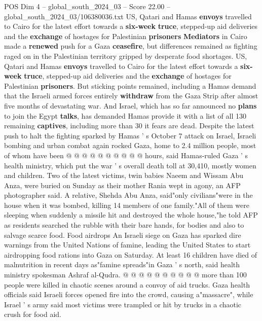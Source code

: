 \begin{textsample}{POS Dim 4 – global\_south\_2024\_03 – Score 22.00 – global\_south\_2024\_03/106380036.txt}  \label{ex:f4_pos_101}
US, Qatari and Hamas \textbf{envoys} travelled to Cairo for the latest effort towards a \textbf{six-week} \textbf{truce}, stepped-up aid deliveries and the \textbf{exchange} of hostages for Palestinian \textbf{prisoners} \textbf{Mediators} in Cairo made a \textbf{renewed} push for a Gaza \textbf{ceasefire}, but differences remained as fighting raged on in the Palestinian territory gripped by desperate food shortages.
US, Qatari and Hamas \textbf{envoys} travelled to Cairo for the latest effort towards a \textbf{six-week} \textbf{truce}, stepped-up aid deliveries and the \textbf{exchange} of hostages for Palestinian \textbf{prisoners}.
But sticking points remained, including a Hamas demand that the Israeli armed forces entirely \textbf{withdraw} from the Gaza Strip after almost five months of devastating war.
And Israel, which has so far announced no \textbf{plans} to join the Egypt \textbf{talks}, has demanded Hamas provide it with a list of all 130 remaining \textbf{captives}, including more than 30 it fears are dead.
Despite the latest push to halt the fighting sparked by Hamas ' s October 7 attack on Israel, Israeli bombing and urban combat again rocked Gaza, home to 2.4 million people, most of whom have been @ @ @ @ @ @ @ @ @ @ hours, said Hamas-ruled Gaza ' s health ministry, which put the war ' s overall death toll at 30,410, mostly women and children.
Two of the latest victims, twin babies Naeem and Wissam Abu Anza, were buried on Sunday as their mother Rania wept in agony, an AFP photographer said.
A relative, Shehda Abu Anza, said"only civilians"were in the house when it was bombed, killing 14 members of one family."All of them were sleeping when suddenly a missile hit and destroyed the whole house,"he told AFP as residents searched the rubble with their bare hands, for bodies and also to salvage scarce food.
Food airdrops An Israeli siege on Gaza has sparked dire warnings from the United Nations of famine, leading the United States to start airdropping food rations into Gaza on Saturday.
At least 16 children have died of malnutrition in recent days as"famine spreads"in Gaza ' s north, said health ministry spokesman Ashraf al-Qudra. @ @ @ @ @ @ @ @ @ @ more than 100 people were killed in chaotic scenes around a convoy of aid trucks.
Gaza health officials said Israeli forces opened fire into the crowd, causing a"massacre", while Israel ' s army said most victims were trampled or hit by trucks in a chaotic crush for food aid.

\end{textsample}
